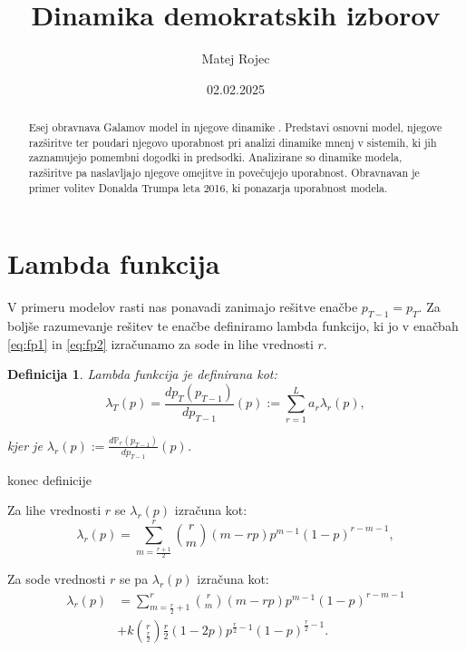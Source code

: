 \documentclass[a4paper,12pt]{article}
\title{Dinamika demokratskih izborov}
\author{Matej Rojec}
\date{02.02.2025}
\newtheorem{definicija}{Definicija}
\newcommand{\p}{\mathbb{P}}
\newcommand{\lam}[1]{\lambda_#1(p)}
\begin{document}
\maketitle
\begin{abstract}
    Esej obravnava Galamov model in njegove dinamike \cite{galam2015stubbornness,galam2016trump,galam2020tipping}. %
Predstavi osnovni model, njegove razširitve ter poudari njegovo uporabnost pri 
analizi dinamike mnenj v sistemih, ki jih zaznamujejo pomembni dogodki in predsodki. 
Analizirane so dinamike modela, razširitve pa naslavljajo njegove omejitve in 
povečujejo uporabnost. Obravnavan je primer volitev Donalda Trumpa leta 2016, 
ki ponazarja uporabnost modela.
\end{abstract}



\section*{Lambda funkcija}

V primeru modelov rasti nas ponavadi zanimajo rešitve enačbe $p_{T-1}=p_{T}$.
Za boljše razumevanje rešitev te enačbe definiramo lambda funkcijo,
ki jo v enačbah \ref{eq:fp1} in \ref{eq:fp2} izračunamo za sode in lihe vrednosti $r$.

\begin{definicija}
    Lambda funkcija je definirana kot:
    \begin{equation}
    \lambda_T(p) = \frac{dp_{T}(p_{T-1})}{dp_{T-1}}(p) := \sum_{r=1}^L a_r \lambda_r(p),
    \end{equation}

    kjer je $\lambda_r(p) := \frac{d\p_{r}(p_{T-1})}{dp_{T-1}}(p)$.
\end{definicija}
    
konec definicije

Za lihe vrednosti $r$ se $\lam{r}$ izračuna kot: 
\begin{equation*}
    \label{eq:fp1}
    \lambda_r(p) = \sum_{m=\frac{r+1}{2}}^r \binom{r}{m} (m-rp) p^{m-1} (1-p)^{r-m-1},
\end{equation*}

Za sode vrednosti $r$ se pa $\lam{r}$ izračuna kot: 
\begin{align*}
    \label{eq:fp2}
    \lambda_r(p) &=
    \sum_{m=\frac{r}{2} + 1}^r \binom{r}{m} (m-rp) p^{m-1} (1-p)^{r-m-1} \nonumber \\
    &+k \binom{r}{\frac{r}{2}} \frac{r}{2} (1-2p) p^{\frac{r}{2}-1} (1-p)^{\frac{r}{2}-1}.
\end{align*}
\end{document}

